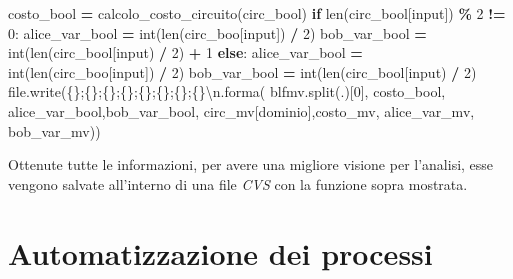 \documentclass[
  italian,
]{book}
\newenvironment{Shaded}{\begin{snugshade}}{\end{snugshade}}
\newcommand{\BuiltInTok}[1]{#1}
\newcommand{\CharTok}[1]{\textcolor[rgb]{0.31,0.60,0.02}{#1}}
\newcommand{\ControlFlowTok}[1]{\textcolor[rgb]{0.13,0.29,0.53}{\textbf{#1}}}
\newcommand{\DecValTok}[1]{\textcolor[rgb]{0.00,0.00,0.81}{#1}}
\newcommand{\NormalTok}[1]{#1}
\newcommand{\OperatorTok}[1]{\textcolor[rgb]{0.81,0.36,0.00}{\textbf{#1}}}
\newcommand{\SpecialCharTok}[1]{\textcolor[rgb]{0.00,0.00,0.00}{#1}}
\newcommand{\StringTok}[1]{\textcolor[rgb]{0.31,0.60,0.02}{#1}}
\begin{document}
\begin{Shaded}
\begin{Highlighting}[]
\NormalTok{      costo\_bool }\OperatorTok{=}\NormalTok{ calcolo\_costo\_circuito(circ\_bool)}
      \ControlFlowTok{if} \BuiltInTok{len}\NormalTok{(circ\_bool[}\StringTok{\textquotesingle{}input\textquotesingle{}}\NormalTok{]) }\OperatorTok{\%} \DecValTok{2} \OperatorTok{!=} \DecValTok{0}\NormalTok{:}
\NormalTok{          alice\_var\_bool }\OperatorTok{=} \BuiltInTok{int}\NormalTok{(}\BuiltInTok{len}\NormalTok{(circ\_boo[}\StringTok{\textquotesingle{}input\textquotesingle{}}\NormalTok{]) }\OperatorTok{/} \DecValTok{2}\NormalTok{)}
\NormalTok{          bob\_var\_bool }\OperatorTok{=} \BuiltInTok{int}\NormalTok{(}\BuiltInTok{len}\NormalTok{(circ\_bool[}\StringTok{\textquotesingle{}input\textquotesingle{}}\NormalTok{) }\OperatorTok{/} \DecValTok{2}\NormalTok{) }\OperatorTok{+} \DecValTok{1}
      \ControlFlowTok{else}\NormalTok{:}
\NormalTok{          alice\_var\_bool }\OperatorTok{=} \BuiltInTok{int}\NormalTok{(}\BuiltInTok{len}\NormalTok{(circ\_boo[}\StringTok{\textquotesingle{}input\textquotesingle{}}\NormalTok{]) }\OperatorTok{/} \DecValTok{2}\NormalTok{)}
\NormalTok{          bob\_var\_bool }\OperatorTok{=} \BuiltInTok{int}\NormalTok{(}\BuiltInTok{len}\NormalTok{(circ\_bool[}\StringTok{\textquotesingle{}input\textquotesingle{}}\NormalTok{) }\OperatorTok{/} \DecValTok{2}\NormalTok{)}
      \BuiltInTok{file}\NormalTok{.write(}\StringTok{\textquotesingle{}}\SpecialCharTok{\{\}}\StringTok{;}\SpecialCharTok{\{\}}\StringTok{;}\SpecialCharTok{\{\}}\StringTok{;}\SpecialCharTok{\{\}}\StringTok{;}\SpecialCharTok{\{\}}\StringTok{;}\SpecialCharTok{\{\}}\StringTok{;}\SpecialCharTok{\{\}}\StringTok{;}\SpecialCharTok{\{\}}\CharTok{\textbackslash{}n}\StringTok{\textquotesingle{}}\NormalTok{.forma(}
\NormalTok{        blfmv.split(}\StringTok{\textquotesingle{}.\textquotesingle{}}\NormalTok{)[}\DecValTok{0}\NormalTok{], costo\_bool, alice\_var\_bool,bob\_var\_bool, }
\NormalTok{          circ\_mv[}\StringTok{\textquotesingle{}dominio\textquotesingle{}}\NormalTok{],costo\_mv, alice\_var\_mv, bob\_var\_mv))}
\end{Highlighting}
\end{Shaded}

Ottenute tutte le informazioni, per avere una migliore visione per l'analisi, esse vengono salvate all'interno di una file \emph{CVS} con la funzione sopra mostrata.

\newpage

\hypertarget{automatizzazione-dei-processi}{%
\section{Automatizzazione dei processi}\label{automatizzazione-dei-processi}}
\end{document}
